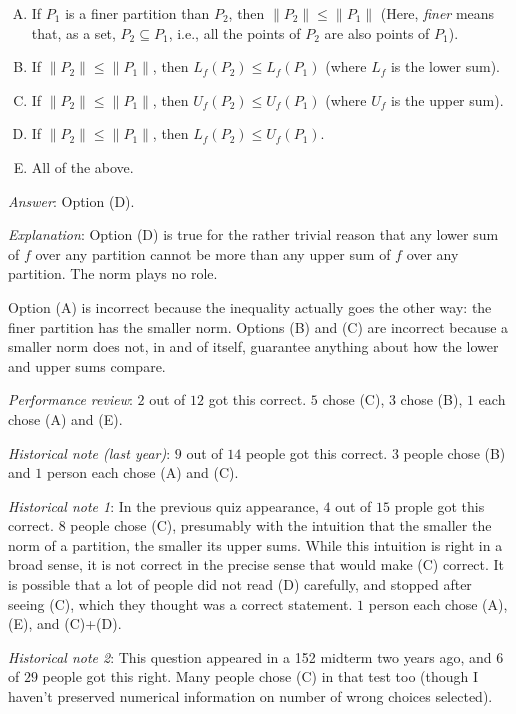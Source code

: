\documentclass[10pt]{amsart}
\begin{document}
\begin{enumerate}
  \begin{enumerate}[(A)]
  \item If $P_1$ is a finer partition than $P_2$, then $\| P_2 \| \le
    \| P_1 \|$ (Here, {\em finer} means that, as a set, $P_2 \subseteq
    P_1$, i.e., all the points of $P_2$ are also points of $P_1$).
  \item If $\| P_2 \| \le \| P_1 \|$, then $L_f(P_2) \le L_f(P_1)$
    (where $L_f$ is the lower sum).
  \item If $\| P_2 \| \le \| P_1 \|$, then $U_f(P_2) \le U_f(P_1)$
    (where $U_f$ is the upper sum).
  \item If $\| P_2 \| \le \| P_1 \|$, then $L_f(P_2) \le U_f(P_1)$.
  \item All of the above.
  \end{enumerate}

  {\em Answer}: Option (D).

  {\em Explanation}: Option (D) is true for the rather trivial reason
  that any lower sum of $f$ over any partition cannot be more than any
  upper sum of $f$ over any partition. The norm plays no role.

  Option (A) is incorrect because the inequality actually goes the
  other way: the finer partition has the smaller norm. Options (B) and
  (C) are incorrect because a smaller norm does not, in and of itself,
  guarantee anything about how the lower and upper sums compare.

  {\em Performance review}: $2$ out of $12$ got this correct. $5$
  chose (C), $3$ chose (B), $1$ each chose (A) and (E).

  {\em Historical note (last year)}: $9$ out of $14$ people got this
  correct. $3$ people chose (B) and $1$ person each chose (A) and (C).

  {\em Historical note 1}: In the previous quiz appearance, $4$ out of
  $15$ prople got this correct. $8$ people chose (C), presumably with
  the intuition that the smaller the norm of a partition, the smaller
  its upper sums. While this intuition is right in a broad sense, it
  is not correct in the precise sense that would make (C) correct. It
  is possible that a lot of people did not read (D) carefully, and
  stopped after seeing (C), which they thought was a correct
  statement. $1$ person each chose (A), (E), and (C)+(D).

  {\em Historical note 2}: This question appeared in a 152 midterm two
  years ago, and $6$ of $29$ people got this right. Many people chose
  (C) in that test too (though I haven't preserved numerical
  information on number of wrong choices selected).


\end{enumerate}
\end{document}
